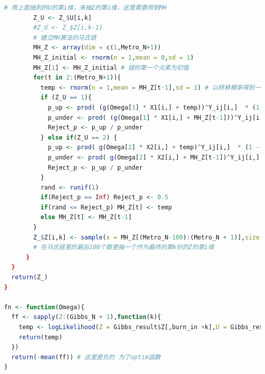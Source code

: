 \documentclass[11pt]{article}
\begin{document}
\begin{lstlisting}[language=R]
        # 用上面抽到的U的第i维，来抽Z的第i维，这里需要用到MH
        Z_U <- Z_$U[i,k]
        #Z_U <- Z_$Z[i,k-1]
        # 建立MH算法的马氏链
        MH_Z <- array(dim = c(1,Metro_N+1))
        MH_Z_initial <- rnorm(n = 1,mean = 0,sd = 1)
        MH_Z[1] <- MH_Z_initial # 链的第一个元素为初值
        for(t in 2:(Metro_N+1)){
          temp <- rnorm(n = 1,mean = MH_Z[t-1],sd = 1) # 以转移概率得到一个数
          if (Z_U == 1){
            p_up <- prod( (g(Omega[1] * X1[i,] + temp))^Y_ij[i,]  * (1 - g(Omega[1] * X1[i,] + temp))^(1 - Y_ij[i,])) * dnorm(x = temp,mean = 0,sd = Omega[3])
            p_under <- prod( (g(Omega[1] * X1[i,] + MH_Z[t-1]))^Y_ij[i,] * (1 - g(Omega[1] * X1[i,] + MH_Z[t-1]))^(1 - Y_ij[i,])) * dnorm(x = MH_Z[t-1],mean = 0,sd = Omega[3])
            Reject_p <- p_up / p_under
          } else if(Z_U == 2) {
            p_up <- prod( g(Omega[2] * X2[i,] + temp)^Y_ij[i,]  * (1 - g(Omega[2] * X2[i,] + temp))^(1 - Y_ij[i,])) * dnorm(x = temp,mean = 0,sd = Omega[4])
            p_under <- prod( g(Omega[2] * X2[i,] + MH_Z[t-1])^Y_ij[i,]  * (1 - g(Omega[2] * X2[i,] + MH_Z[t-1]))^(1 - Y_ij[i,])) * dnorm(x = MH_Z[t-1],mean = 0,sd = Omega[4])
            Reject_p <- p_up / p_under
          }
          rand <- runif(1)
          if(Reject_p == Inf) Reject_p <- 0.5
          if(rand <= Reject_p) MH_Z[t] <- temp
          else MH_Z[t] <- MH_Z[t-1]
        }
        Z_$Z[i,k] <- sample(x = MH_Z[(Metro_N-100):(Metro_N + 1)],size = 1)
        # 在马氏链里的最后100个数里抽一个作为最终的第k份的Z的第i维
      }
  }
  return(Z_)
}

fn <- function(Omega){
  ff <- sapply(2:(Gibbs_N + 1),function(k){
    temp <- logLikelihood(Z = Gibbs_result$Z[,burn_in +k],U = Gibbs_result$U[,burn_in +k],Omega,m)
    return(temp)
  })
  return(-mean(ff)) # 这里是负的 为了optim函数
}
  \end{lstlisting}
\end{document}

